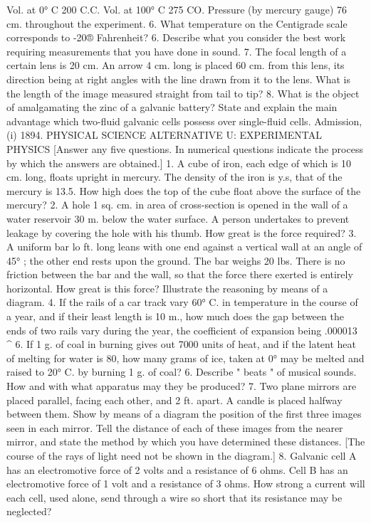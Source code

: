 Vol. at 0° C 200 C.C.
Vol. at 100° C 275 CO.
Pressure (by mercury gauge) 76 cm. throughout the experiment. 6. What temperature on the Centigrade scale corresponds to -20® Fahrenheit?
6. Describe what you consider the best work requiring measurements that you have done in sound.
7. The focal length of a certain lens is 20 cm. An arrow 4 cm. long is placed 60 cm. from this lens, its direction being at right angles with the line drawn from it to the lens. What is the length of the image measured straight from tail to tip?
8. What is the object of amalgamating the zinc of a galvanic battery? State and explain the main advantage which two-fluid galvanic cells possess over single-fluid cells.
Admission, (i) 1894.
PHYSICAL SCIENCE ALTERNATIVE U: EXPERIMENTAL PHYSICS
[Answer any five questions. In numerical questions indicate the process by which the answers are obtained.]
1. A cube of iron, each edge of which is 10 cm. long, floats upright in mercury. The density of the iron is y.s, that of the mercury is 13.5. How high does the top of the cube float above the surface of the mercury?
2. A hole 1 sq. cm. in area of cross-section is opened in the wall of a water reservoir 30 m. below the water surface. A person undertakes to prevent leakage by covering the hole with his thumb. How great is the force required?
3. A uniform bar lo ft. long leans with one end against a vertical wall at an angle of 45° ; the other end rests upon the ground. The bar weighs 20 lbs. There is no friction between the bar and the wall, so that the force there exerted is entirely horizontal. How great is this force?
Illustrate the reasoning by means of a diagram.
4. If the rails of a car track vary 60° C. in temperature in the course of a year, and if their least length is 10 m., how much does the gap between the ends of two rails vary during the year, the coefficient of expansion being .000013 ^
6. If 1 g. of coal in burning gives out 7000 units of heat, and if the latent heat of melting for water is 80, how many grams of ice, taken at 0° may be melted and raised to 20° C. by burning 1 g. of coal?
6. Describe " beats " of musical sounds. How and with what apparatus may they be produced?
7. Two plane mirrors are placed parallel, facing each other, and 2 ft. apart. A candle is placed halfway between them. Show by means of a diagram the position of the first three images seen in each mirror. Tell the distance of each of these images from the nearer mirror, and state the method by which you have determined these distances. [The course of the rays of light need not be shown in the diagram.]
8. Galvanic cell A has an electromotive force of 2 volts and a resistance of 6 ohms. Cell B has an electromotive force of 1 volt and a resistance of 3 ohms. How strong a current will each cell, used alone, send through a wire so short that its resistance may be neglected?
